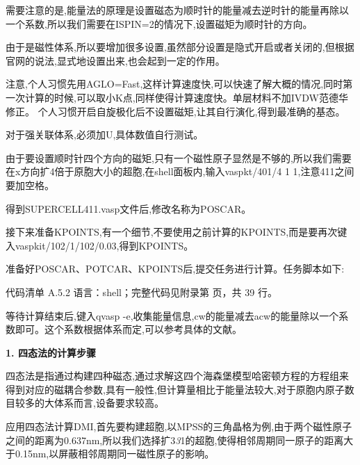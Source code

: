 \documentclass[lang=cn,scheme=chinese,color=blue,device=normal,toc=onecol,math=cm]{elegantbook}
\begin{document}
需要注意的是,能量法的原理是设置磁态为顺时针的能量减去逆时针的能量再除以一个系数,所以我们需要在ISPIN=2的情况下,设置磁矩为顺时针的方向。\par


由于是磁性体系,所以要增加很多设置,虽然部分设置是隐式开启或者关闭的,但根据官网的说法,显式地设置出来,也会起到一定的作用。\par


注意,个人习惯先用AGLO=Fast,这样计算速度快,可以快速了解大概的情况,同时第一次计算的时候,可以取小K点,同样使得计算速度快。单层材料不加IVDW范德华修正。 个人习惯开启自旋极化后不设置磁矩,让其自行演化,得到最准确的基态。\par


对于强关联体系,必须加U,具体数值自行测试。\par


由于要设置顺时针四个方向的磁矩,只有一个磁性原子显然是不够的,所以我们需要在x方向扩4倍于原胞大小的超胞,在shell面板内,输入vaspkt/\allowbreak{}401/\allowbreak{}4 1 1,注意411之间要加空格。\par


得到SUPERCELL411.vasp文件后,修改名称为POSCAR。\par


接下来准备KPOINTS,有一个细节,不要使用之前计算的KPOINTS,而是要再次键入vaspkit/\allowbreak{}102/\allowbreak{}1/\allowbreak{}102/\allowbreak{}0.03,得到KPOINTS。\par


准备好POSCAR、POTCAR、KPOINTS后,提交任务进行计算。任务脚本如下:\par


\begin{codeindexbox}{代码清单 A.5.2}
语言：shell；完整代码见附录第 \pageref{code:5:2} 页，共 39 行。
\end{codeindexbox}


等待计算结束后,键入qvasp -e,收集能量信息,cw的能量减去acw的能量除以一个系数即可。这个系数根据体系而定,可以参考具体的文献。\par


\textbf{ 1. 四态法的计算步骤}\par


四态法是指通过构建四种磁态,通过求解这四个海森堡模型哈密顿方程的方程组来得到对应的磁耦合参数,具有一般性,但计算量相比于能量法较大,对于原胞内原子数目较多的大体系而言,设备要求较高。\par


应用四态法计算DMI,首先要构建超胞,以MPSS的三角晶格为例,由于两个磁性原子之间的距离为0.637nm,所以我们选择扩3\emph{3}1的超胞,使得相邻周期同一原子的距离大于0.15nm,以屏蔽相邻周期同一磁性原子的影响。\par
\end{document}
